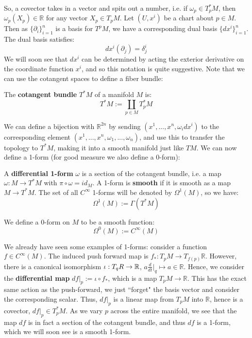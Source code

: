 So, a covector takes in a vector and spits out a number, i.e. if $\omega_p\in T_p^* M$, then $\omega_p(X_p)\in\mathbb R$ 
for any vector $X_p\in T_p M$. Let $(U, x^i)$ be a chart about $p\in M$. Then as $\{\partial_i\}_{i = 1}^n$ is a basis for 
$T^p M$, we have a corresponding dual basis $\{dx^i\}_{i = 1}^n$. The dual basis satisfies:
\begin{equation}
	dx^i(\partial_j) = \delta^i_j
\end{equation}
We will soon see that $dx^i$ can be determined by acting the exterior derivative on the coordinate function $x^i$, and so this 
notation is quite suggestive. Note that we can use the cotangent spaces to define a fiber bundle:
\begin{definition}
	The \textbf{cotangent bundle} $T^*M$ of a manifold $M$ is:
	\begin{equation}
		T^* M := \coprod_{p\in M} T_p^* M
	\end{equation}
\end{definition}
We can define a bijection with $\mathbb R^{2n}$ by sending $(x^1, ..., x^n, \omega_i dx^i)$ to the corresponding element 
$(x^1, ..., x^n, \omega_1, ..., \omega_n)$, and use this to transfer the topology to $T^*M$, making it into a smooth manifold 
just like $TM$. We can now define a 1-form (for good measure we also define a 0-form):
\begin{definition}[1-form]
	A \textbf{differential 1-form} $\omega$ is a section of the cotangent bundle, i.e. a map $\omega : M\rightarrow T^* M$ with 
	$\pi\circ \omega = id_M$. A 1-form is \textbf{smooth} if it is smooth as a map $M\rightarrow T^*M$. The set of all 
	$C^\infty$ 1-forms will be denoted by $\Omega^1(M)$, so we have:
	\begin{equation}
		\Omega^1(M) := \Gamma(T^*M)
	\end{equation}
\end{definition}
\begin{definition}[0-form]
	We define a 0-form on $M$ to be a smooth function:
	\begin{equation}
		\Omega^0(M) := C^\infty(M)
	\end{equation}
\end{definition}
We already have seen some examples of 1-forms: consider a function $f\in C^\infty(M)$. The induced push forward map 
is $f_* : T_p M\rightarrow T_{f(p)}\mathbb R$. However, there is a canonical isomorphism $\iota : T_{q}\mathbb \mathbb R
\rightarrow\mathbb R$, $a\frac{d}{dt}|_q\mapsto a\in\mathbb R$. Hence, we consider the \textbf{differential map} $df|_p 
:= \iota\circ f_*$, which is a map $T_p M\rightarrow \mathbb R$. This has the exact same action as the push-forward, we 
just ``forget" the basis vector and consider the corresponding scalar. Thus, $df|_p$ is a linear map from $T_p M$ into 
$\mathbb R$, hence is a covector, $df|_p\in T_p^* M$. As we vary $p$ across the entire manifold, we see that the map $df$ is 
in fact a section of the cotangent bundle, and thus $df$ is a 1-form, which we will soon see is a smooth 1-form. 

